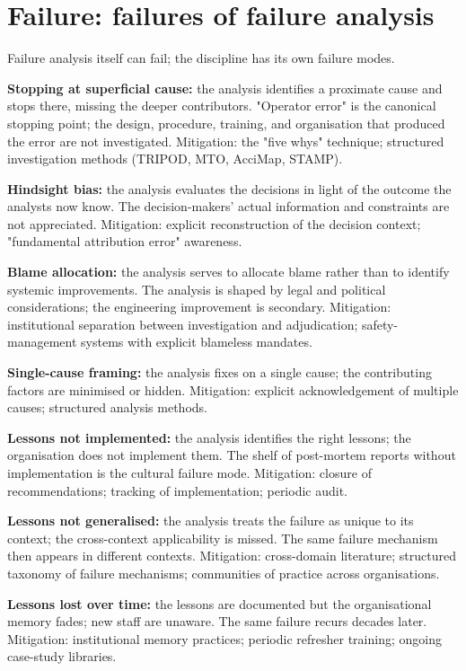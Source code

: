 \section{Failure: failures of failure analysis}

Failure analysis itself can fail; the discipline has its own failure modes.

\textbf{Stopping at superficial cause:} the analysis identifies a proximate cause and stops there, missing the deeper contributors. "Operator error" is the canonical stopping point; the design, procedure, training, and organisation that produced the error are not investigated. Mitigation: the "five whys" technique; structured investigation methods (TRIPOD, MTO, AcciMap, STAMP).

\textbf{Hindsight bias:} the analysis evaluates the decisions in light of the outcome the analysts now know. The decision-makers' actual information and constraints are not appreciated. Mitigation: explicit reconstruction of the decision context; "fundamental attribution error" awareness.

\textbf{Blame allocation:} the analysis serves to allocate blame rather than to identify systemic improvements. The analysis is shaped by legal and political considerations; the engineering improvement is secondary. Mitigation: institutional separation between investigation and adjudication; safety-management systems with explicit blameless mandates.

\textbf{Single-cause framing:} the analysis fixes on a single cause; the contributing factors are minimised or hidden. Mitigation: explicit acknowledgement of multiple causes; structured analysis methods.

\textbf{Lessons not implemented:} the analysis identifies the right lessons; the organisation does not implement them. The shelf of post-mortem reports without implementation is the cultural failure mode. Mitigation: closure of recommendations; tracking of implementation; periodic audit.

\textbf{Lessons not generalised:} the analysis treats the failure as unique to its context; the cross-context applicability is missed. The same failure mechanism then appears in different contexts. Mitigation: cross-domain literature; structured taxonomy of failure mechanisms; communities of practice across organisations.

\textbf{Lessons lost over time:} the lessons are documented but the organisational memory fades; new staff are unaware. The same failure recurs decades later. Mitigation: institutional memory practices; periodic refresher training; ongoing case-study libraries.


